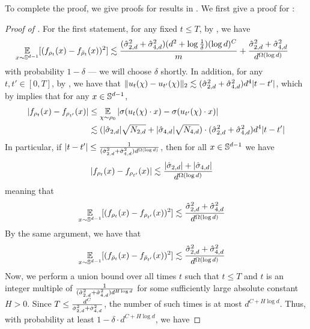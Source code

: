 To complete the proof, we give proofs for results in .
We first give a proof for :
\begin{proof}[Proof of ]
For the first statement, for any fixed $t \leq T$, by , we have
\begin{align}
\operatorname*{\mathbb{E}}_{x \sim \mathbb{S}^{d - 1}} [(f_{\rho_t}(x) - f_{{\bar{\rho}}_t}(x))^2]
& \lesssim \frac{(\hat{\sigma}_{2, d}^2 + \hat{\sigma}_{4, d}^2) (d^2 + \log \frac{1}{\delta}) (\log d)^C}{m} + \frac{\hat{\sigma}_{2, d}^2 + \hat{\sigma}_{4, d}^2}{d^{\Omega(\log d)}}
\end{align}
with probability $1 - \delta$ --- we will choose $\delta$ shortly. In addition, for any $t, t' \in [0, T]$, by , we have that $\|u_t(\chi) - u_{t'}(\chi)\|_2 \lesssim (\hat{\sigma}_{2, d}^2 + \hat{\sigma}_{4, d}^2) d^4 |t - t'|$, which by  implies that for any $x \in \mathbb{S}^{d - 1}$, 
\begin{align}
|f_{\rho_t}(x) - f_{\rho_{t'}}(x)|
& \leq \operatorname*{\mathbb{E}}_{\chi \sim \rho_0} |\sigma(u_t(\chi) \cdot x) - \sigma(u_{t'}(\chi) \cdot x)| \\
& \lesssim (|\hat{\sigma}_{2, d}| \sqrt{N_{2, d}} + |\hat{\sigma}_{4, d}| \sqrt{N_{4, d}}) \cdot (\hat{\sigma}_{2, d}^2 + \hat{\sigma}_{4, d}^2) d^4 |t - t'|
\end{align}
In particular, if $|t - t'| \leq \frac{1}{(\hat{\sigma}_{2, d}^2 + \hat{\sigma}_{4, d}^2) d^{\Omega(\log d)}}$, then for all $x \in \mathbb{S}^{d - 1}$ we have
\begin{align}
|f_{\rho_t}(x) - f_{\rho_{t'}}(x)| 
& \lesssim \frac{|\hat{\sigma}_{2, d}| + |\hat{\sigma}_{4, d}|}{d^{\Omega(\log d)}}
\end{align}
meaning that
\begin{align}
\operatorname*{\mathbb{E}}_{x \sim \mathbb{S}^{d - 1}} [(f_{\rho_t}(x) - f_{\rho_{t'}}(x))^2]
& \lesssim \frac{\hat{\sigma}_{2, d}^2 + \hat{\sigma}_{4, d}^2}{d^{\Omega(\log d)}}
\end{align}
By the same argument, we have that
\begin{align}
\operatorname*{\mathbb{E}}_{x \sim \mathbb{S}^{d - 1}} [(f_{{\bar{\rho}}_t}(x) - f_{{\bar{\rho}}_{t'}}(x))^2]
& \lesssim \frac{\hat{\sigma}_{2, d}^2 + \hat{\sigma}_{4, d}^2}{d^{\Omega(\log d)}}
\end{align}
Now, we perform a union bound over all times $t$ such that $t \leq T$ and $t$ is an integer multiple of $\frac{1}{(\hat{\sigma}_{2, d}^2 + \hat{\sigma}_{4, d}^2) d^{H \log d}}$ for some sufficiently large absolute constant $H > 0$. Since $T \leq \frac{d^C}{\hat{\sigma}_{2, d}^2 + \hat{\sigma}_{4, d}^2}$, the number of such times is at most $d^{C + H \log d}$. Thus, with probability at least $1 - \delta \cdot d^{C + H \log d}$, we have

\end{proof}
